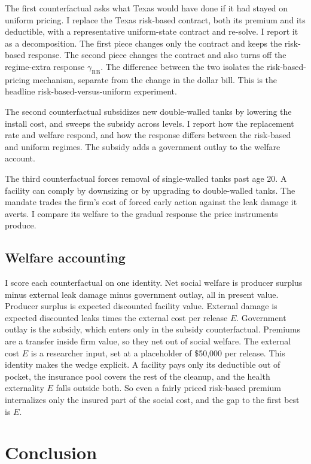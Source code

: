 \documentclass[
  12pt,
]{article}
\begin{document}
The first counterfactual asks what Texas would have done if it had
stayed on uniform pricing. I replace the Texas risk-based contract, both
its premium and its deductible, with a representative uniform-state
contract and re-solve. I report it as a decomposition. The first piece
changes only the contract and keeps the risk-based response. The second
piece changes the contract and also turns off the regime-extra response
\(\gamma_{\text{RB}}\). The difference between the two isolates the
risk-based-pricing mechanism, separate from the change in the dollar
bill. This is the headline risk-based-versus-uniform experiment.

The second counterfactual subsidizes new double-walled tanks by lowering
the install cost, and sweeps the subsidy across levels. I report how the
replacement rate and welfare respond, and how the response differs
between the risk-based and uniform regimes. The subsidy adds a
government outlay to the welfare account.

The third counterfactual forces removal of single-walled tanks past age
20. A facility can comply by downsizing or by upgrading to double-walled
tanks. The mandate trades the firm's cost of forced early action against
the leak damage it averts. I compare its welfare to the gradual response
the price instruments produce.

\subsection{Welfare accounting}\label{welfare-accounting}

I score each counterfactual on one identity. Net social welfare is
producer surplus minus external leak damage minus government outlay, all
in present value. Producer surplus is expected discounted facility
value. External damage is expected discounted leaks times the external
cost per release \(E\). Government outlay is the subsidy, which enters
only in the subsidy counterfactual. Premiums are a transfer inside firm
value, so they net out of social welfare. The external cost \(E\) is a
researcher input, set at a placeholder of \$50,000 per release. This
identity makes the wedge explicit. A facility pays only its deductible
out of pocket, the insurance pool covers the rest of the cleanup, and
the health externality \(E\) falls outside both. So even a fairly priced
risk-based premium internalizes only the insured part of the social
cost, and the gap to the first best is \(E\).

\section{Conclusion}\label{conclusion}
\end{document}
